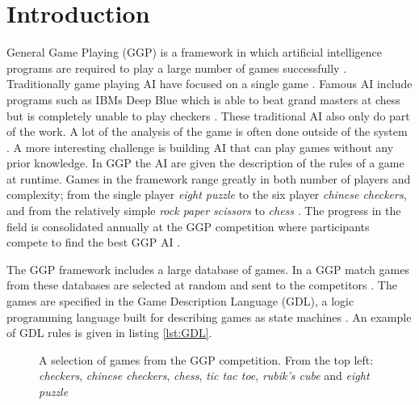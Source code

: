 \chapter{Introduction}\label{ch:intro}
General Game Playing (GGP) is a framework in which artificial intelligence programs are required to play a large number of games successfully \cite{Genesereth/GGPOverview}.
Traditionally game playing AI have focused on a single game \cite{AlphaGo,DeepBlue,Schaeffer/Checkers,Tesauro/Backgammon}. Famous AI include programs such as IBMs Deep Blue which is able to beat grand masters at chess but is completely unable to play checkers \cite{DeepBlue}. These traditional AI also only do part of the work. A lot of the analysis of the game is often done outside of the system \cite{Schaeffer/Checkers}. A more interesting challenge is building AI that can play games without any prior knowledge. In GGP the AI are given the description of the rules of a game at runtime. Games in the framework range greatly in both number of players and complexity; from the single player \textit{eight puzzle} to the six player \textit{chinese checkers}, and from the relatively simple \textit{rock paper scissors} to \textit{chess}  \cite{GGP-Website}. The progress in the field is consolidated annually at the GGP competition where participants compete to find the best GGP AI \cite{Genesereth/GGPOverview}.

The GGP framework includes a large database of games. In a GGP match games from these databases are selected at random and sent to the competitors \cite{Genesereth/GGPOverview}. The games are specified in the Game Description Language (GDL), a logic programming language built for describing games as state machines \cite{GDL_Spec}. An example of GDL rules is given in listing \ref{lst:GDL}.


\begin{figure}[ht]
	\centering
	\caption{A selection of games from the GGP competition. From the top left: \textit{checkers}, \textit{chinese checkers}, \textit{chess}, \textit{tic tac toe}, \textit{rubik's cube} and \textit{eight puzzle}}
\end{figure}



